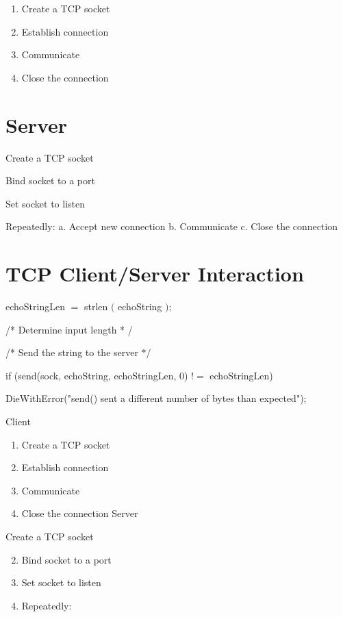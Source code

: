 \documentclass[10pt]{article}
\begin{document}
\begin{enumerate}
  \item Create a TCP socket

  \item Establish connection

  \item Communicate

  \item Close the connection

\end{enumerate}

\section{Server}
Create a TCP socket

Bind socket to a port

Set socket to listen

Repeatedly:
a. Accept new connection
b. Communicate
c. Close the connection

\section{TCP Client/Server Interaction}
echoStringLen $=$ strlen $($ echoString $)$;

/* Determine input length * /

/* Send the string to the server $* /$

if (send(sock, echoString, echoStringLen, 0) $!=$ echoStringLen)

DieWithError("send() sent a different number of bytes than expected");

Client

\begin{enumerate}
  \item Create a TCP socket

  \item Establish connection

  \item Communicate

  \item Close the connection Server

\end{enumerate}

Create a TCP socket

\begin{enumerate}
  \setcounter{enumi}{1}
  \item Bind socket to a port

  \item Set socket to listen

  \item Repeatedly:

\end{enumerate}
\end{document}
